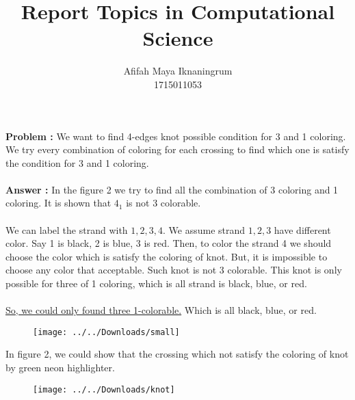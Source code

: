 \documentclass[a4paper,10pt]{article}
\title{Report Topics in Computational Science}
\author{Afifah Maya Iknaningrum \\ 1715011053}
\begin{document}
	\maketitle
	\textbf{Problem :}
	We want to find 4-edges knot possible condition for 3 and 1 coloring. We try every combination of coloring for each crossing to find which one is satisfy the condition for 3 and 1 coloring. \\ \\
	\textbf{Answer :}
	In the figure 2 we try to find all the combination of 3 coloring and 1 coloring. It is shown that $ 4_{1} $ is not 3 colorable. \\ \\We can label the strand with $ 1,2,3,4 $. We assume strand $ 1,2,3 $ have different color. Say 1 is black, 2 is blue, 3 is red. Then, to color the strand 4 we should choose the color which is satisfy the coloring of knot. But, it is impossible to choose any color that acceptable. Such knot is not 3 colorable. This knot is only possible for three of 1 coloring, which is all strand is black, blue, or red.\\ \\
	\underline{So, we could only found three 1-colorable.} Which is all black, blue, or red.
	
	\begin{figure}[h!]
		\centering
		\texttt{[image: ../../Downloads/small]}
		\caption{}
		\label{fig:small}
	\end{figure}
	
	In figure 2, we could show that the crossing which not satisfy the coloring of knot by green neon highlighter.
	
	\newpage
	\begin{figure}
		\centering
		\texttt{[image: ../../Downloads/knot]}
		\caption{}
		\label{fig:knot}
	\end{figure}
	
\end{document}

